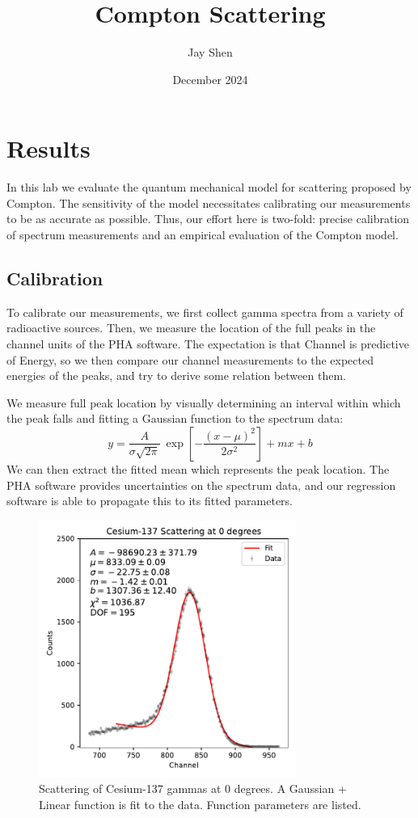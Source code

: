 \documentclass[12pt, letterpaper]{article}
\title{Compton Scattering}
\author{Jay Shen}
\date{December 2024}
\begin{document}
\maketitle

\section{Results}

In this lab we evaluate the quantum mechanical model for scattering proposed by Compton. The sensitivity of the model necessitates calibrating our measurements to be as accurate as possible. Thus, our effort here is two-fold: precise calibration of spectrum measurements and an empirical evaluation of the Compton model. 

\subsection{Calibration}

To calibrate our measurements, we first collect gamma spectra from a variety of radioactive sources. Then, we measure the location of the full peaks in the channel units of the PHA software. The expectation is that Channel is predictive of Energy, so we then compare our channel measurements to the expected energies of the peaks, and try to derive some relation between them. 

We measure full peak location by visually determining an interval within which the peak falls and fitting a Gaussian function to the spectrum data: 
\[
    y = \frac{A}{\sigma \sqrt{2 \pi}} \: \exp[- \frac{(x - \mu)^2}{2 \sigma^2}] + mx + b
\]
We can then extract the fitted mean which represents the peak location. The PHA software provides uncertainties on the spectrum data, and our regression software is able to propagate this to its fitted parameters. 

\begin{figure}[!h]
    \centering
    \includegraphics[width=0.75\textwidth]{experiment2/figures/scattering3/0.pdf}
    \caption{Scattering of Cesium-137 gammas at 0 degrees. A Gaussian + Linear function is fit to the data. Function parameters are listed. }
    \label{fig:scattering-0}
\end{figure}
\end{document}
